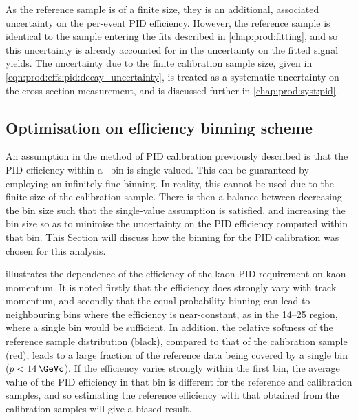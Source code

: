 As the reference sample is of a finite size, they is an additional, associated 
uncertainty on the per-event \ac{PID} efficiency.
However, the reference sample is identical to the sample entering the fits 
described in \cref{chap:prod:fitting}, and so this uncertainty is already 
accounted for in the uncertainty on the fitted signal yields.
The uncertainty due to the finite calibration sample size, given in 
\cref{eqn:prod:effs:pid:decay_uncertainty}, is treated as a systematic 
uncertainty on the cross-section measurement, and is discussed further in 
\cref{chap:prod:syst:pid}.

\subsection{Optimisation on efficiency binning scheme}
\label{chap:prod:effs:pid:binning}

An assumption in the method of \ac{PID} calibration previously described is 
that the \ac{PID} efficiency within a \ptotetanspd\ bin is single-valued.
This can be guaranteed by employing an infinitely fine binning.
In reality, this cannot be used due to the finite size of the calibration 
sample.
There is then a balance between decreasing the bin size such that the 
single-value assumption is satisfied, and increasing the bin size so as to 
minimise the uncertainty on the \ac{PID} efficiency computed within that bin.
This Section will discuss how the binning for the \ac{PID} calibration was 
chosen for this analysis.

\Cref{} illustrates the dependence of the efficiency of the kaon \ac{PID} 
requirement on kaon momentum.
It is noted firstly that the efficiency does strongly vary with track momentum, 
and secondly that the equal-probability binning can lead to neighbouring bins 
where the efficiency is near-constant, as in the 14--\SI{25}{\GeVc} region, 
where a single bin would be sufficient.
In addition, the relative softness of the reference sample distribution 
(black), compared to that of the calibration sample (red), leads to a large 
fraction of the reference data being covered by a single bin ($p < 
\SI{14}{\GeVc}$).
If the efficiency varies strongly within the first bin, the average value of 
the \ac{PID} efficiency in that bin is different for the reference and 
calibration samples, and so estimating the reference efficiency with that 
obtained from the calibration samples will give a biased result.

